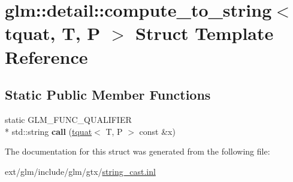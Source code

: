 \hypertarget{structglm_1_1detail_1_1compute__to__string_3_01tquat_00_01_t_00_01_p_01_4}{\section{glm\-:\-:detail\-:\-:compute\-\_\-to\-\_\-string$<$ tquat, T, P $>$ Struct Template Reference}
\label{structglm_1_1detail_1_1compute__to__string_3_01tquat_00_01_t_00_01_p_01_4}
}
\subsection*{Static Public Member Functions}
\begin{DoxyCompactItemize}
\item 
\hypertarget{structglm_1_1detail_1_1compute__to__string_3_01tquat_00_01_t_00_01_p_01_4_abc8c7e5ad982ee05c7c33fb22ab86fcc}{static G\-L\-M\-\_\-\-F\-U\-N\-C\-\_\-\-Q\-U\-A\-L\-I\-F\-I\-E\-R \\*
std\-::string {\bfseries call} (\hyperlink{structglm_1_1tquat}{tquat}$<$ T, P $>$ const \&x)}\label{structglm_1_1detail_1_1compute__to__string_3_01tquat_00_01_t_00_01_p_01_4_abc8c7e5ad982ee05c7c33fb22ab86fcc}

\end{DoxyCompactItemize}


The documentation for this struct was generated from the following file\-:\begin{DoxyCompactItemize}
\item 
ext/glm/include/glm/gtx/\hyperlink{string__cast_8inl}{string\-\_\-cast.\-inl}\end{DoxyCompactItemize}
